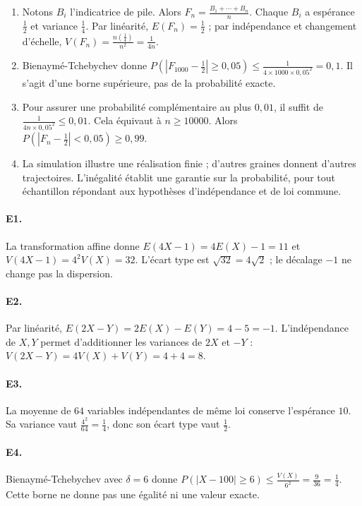 \begin{enumerate}
\item Notons $B_i$ l'indicatrice de pile. Alors $F_n=\frac{B_1+\cdots+B_n}{n}$. Chaque $B_i$ a espérance $\frac{1}{2}$ et variance $\frac{1}{4}$. Par linéarité, $E(F_n)=\frac{1}{2}$ ; par indépendance et changement d'échelle, $V(F_n)=\frac{n(\frac{1}{4})}{n^2}=\frac{1}{4n}$.
\item Bienaymé-Tchebychev donne $P(|F_{1000}-\frac{1}{2}|\ge0{,}05)\le\frac{1}{4\times1000\times0{,}05^2}=0{,}1$. Il s'agit d'une borne supérieure, pas de la probabilité exacte.
\item Pour assurer une probabilité complémentaire au plus $0{,}01$, il suffit de $\frac{1}{4n\times0{,}05^2}\le0{,}01$. Cela équivaut à $n\ge10000$. Alors $P(|F_n-\frac{1}{2}|<0{,}05)\ge0{,}99$.
\item La simulation illustre une réalisation finie ; d'autres graines donnent d'autres trajectoires. L'inégalité établit une garantie sur la probabilité, pour tout échantillon répondant aux hypothèses d'indépendance et de loi commune.
\end{enumerate}

\paragraph{E1.}La transformation affine donne $E(4X-1)=4E(X)-1=11$ et $V(4X-1)=4^2V(X)=32$. L'écart type est $\sqrt{32}=4\sqrt2$ ; le décalage $-1$ ne change pas la dispersion.

\paragraph{E2.}Par linéarité, $E(2X-Y)=2E(X)-E(Y)=4-5=-1$. L'indépendance de $X,Y$ permet d'additionner les variances de $2X$ et $-Y$ : $V(2X-Y)=4V(X)+V(Y)=4+4=8$.

\paragraph{E3.}La moyenne de $64$ variables indépendantes de même loi conserve l'espérance $10$. Sa variance vaut $\frac{4^2}{64}=\frac{1}{4}$, donc son écart type vaut $\frac{1}{2}$.

\paragraph{E4.}Bienaymé-Tchebychev avec $\delta=6$ donne $P(|X-100|\ge6)\le \frac{V(X)}{6^2}=\frac{9}{36}=\frac{1}{4}$. Cette borne ne donne pas une égalité ni une valeur exacte.

